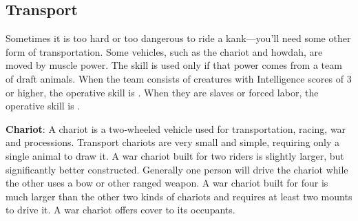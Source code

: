 \subsection{Transport}
Sometimes it is too hard or too dangerous to ride a kank---you'll need some other form of transportation. Some vehicles, such as the chariot and howdah, are moved by muscle power. The  skill is used only if that power comes from a team of draft animals. When the team consists of creatures with Intelligence scores of 3 or higher, the operative skill is . When they are slaves or forced labor, the operative skill is .


\textbf{Chariot}: A chariot is a two‐wheeled vehicle used for transportation, racing, war and processions. Transport chariots are very small and simple, requiring only a single animal to draw it. A war chariot built for two riders is slightly larger, but significantly better constructed. Generally one person will drive the chariot while the other uses a bow or other ranged weapon. A war chariot built for four is much larger than the other two kinds of chariots and requires at least two mounts to drive it. A war chariot offers cover to its occupants.

